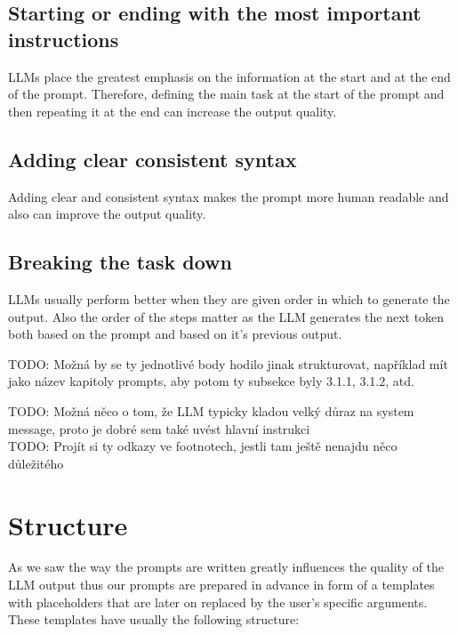 \subsection{Starting or ending with the most important instructions}
LLMs place the greatest emphasis on the information at the start and at the end of the prompt. Therefore, defining the main task at the start of the prompt and then repeating it at the end can increase the output quality.


\subsection{Adding clear consistent syntax}
Adding clear and consistent syntax makes the prompt more human readable and also can improve the output quality.


\subsection{Breaking the task down}
LLMs usually perform better when they are given order in which to generate the output. Also the order of the steps matter as the LLM generates the next token both based on the prompt and based on it's previous output.



TODO: Možná by se ty jednotlivé body hodilo jinak strukturovat, například mít jako název kapitoly prompts, aby potom ty subsekce byly 3.1.1, 3.1.2, atd.

TODO: Možná něco o tom, že LLM typicky kladou velký důraz na system message, proto je dobré sem také uvést hlavní instrukci \\

TODO: Projít si ty odkazy ve footnotech, jestli tam ještě nenajdu něco důležitého \\


\section{Structure}

As we saw the way the prompts are written greatly influences the quality of the LLM output thus our prompts are prepared in advance in form of a templates with placeholders that are later on replaced by the user's specific arguments. These templates have usually the following structure:

